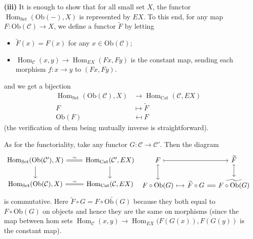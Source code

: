 \documentclass[a4paper,11pt]{amsart}
\newcommand{\set}{\mathrm{Set}}
\newcommand{\C}{\mathcal C}
\renewcommand{\hom}{\operatorname{Hom}}
\newcommand{\cat}{\mathrm{Cat}}
\newcommand{\ob}{\mathrm{Ob}}
\newcommand{\wt}{\widetilde}
\begin{document}
\textbf{(iii)} It is enough to show that for all small set $X$, the functor $\hom_\set(\ob(-),X)$ is represented by $EX$. To this end, for any map $F\colon\ob(\C)\to X$, we define a functor $\wt F$ by letting
\begin{itemize}
\item $\wt F(x)=F(x)$ for any $x\in\ob(\C)$;

\item $\hom_\C(x,y)\to\hom_{EX}(Fx,Fy)$ is the constant map, sending each morphism $f\colon x\to y$ to $(Fx,Fy)$.
\end{itemize}
and we get a bijection
\begin{align*}
\hom_\set(\ob(\C),X)&\to\hom_\cat(\C,EX)\\
F&\mapsto \wt F\\
\ob(F)&\mapsfrom F
\end{align*}
(the verification of them being mutually inverse is straightforward).

As for the functoriality, take any functor $G\colon\C\to\C'$. Then the diagram
\[
\begin{tikzcd}
\hom_\set(\ob(\C'),X)\arrow[r,equal,"\sim"]\arrow[d]& \hom_\cat(\C',EX)\arrow[d]\\
\hom_\set(\ob(\C),X)\arrow[r,equal,"\sim"]& \hom_\cat(\C,EX)
\end{tikzcd}
\ 
\begin{tikzcd}[column sep=small]
F\arrow[rr,mapsto]\arrow[d,mapsto]&& \wt F\arrow[d,mapsto]\\
F\circ\ob(G)\arrow[r,mapsto]& \wt F\circ G\arrow[r,equal]& \wt{F\circ\ob(G)}
\end{tikzcd}
\]
is commutative. Here $\wt F\circ G=\wt{F\circ\ob(G)}$ because they both equal to $F\circ \ob(G)$ on objects and hence they are the same on morphisms (since the map between hom sets $\hom_\C(x,y)\to\hom_{EX}(F(G(x)),F(G(y))$ is the constant map).
\end{document}
